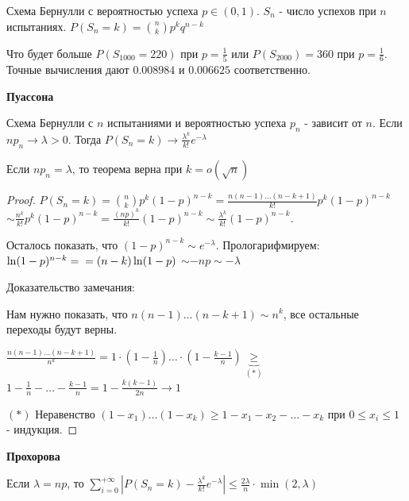 \begin{definition}
    Схема Бернулли с вероятностью успеха $p \in (0, 1)$. $S_n$ - число успехов при $n$ испытаниях. $P(S_n = k) = \binom{n}{k} p^k q^{n - k}$

    Что будет больше $P(S_{1000} = 220)$ при $p = \frac{1}{5}$ или $P(S_{2000}) = 360$ при $p = \frac{1}{6}$. Точные вычисления дают $0.008984$ и 
    $0.006625$ соответственно.

\end{definition}

\begin{theorem}
    \textbf{Пуассона}

    Схема Бернулли с $n$ испытаниями и вероятностью успеха $p_n$ - зависит от $n$.
    Если $np_n \rightarrow \lambda > 0$. Тогда $P(S_n = k) \rightarrow \frac{\lambda^k}{k!} e^{-\lambda}$
\end{theorem}

\begin{remark}
    Если $n p_n = \lambda$, то теорема верна при $k = o(\sqrt{n})$
\end{remark}

\begin{proof}
    $P(S_n = k) = \binom{n}{k} p^k (1 - p)^{n - k} = \frac{n(n - 1)\ldots(n - k + 1)}{k!} p^k (1 - p)^{n - k}$
    $\sim \frac{n^k}{k!} p^k (1 - p)^{n - k} = \frac{(np)^k}{k!} (1 - p)^{n - k} \sim \frac{\lambda^k}{k!} (1 - p)^{n - k}$.
    
    Осталось показать, что $(1 - p)^{n - k} \sim e^{-\lambda}$. Прологарифмируем: $\ln (1 - p)^{n - k} = \\ = (n - k) \ln (1 - p)$
    $\sim -n p \sim -\lambda$

    Доказательство замечания:

    Нам нужно показать, что $n(n - 1)\ldots(n - k + 1) \sim n^k$, все остальные переходы будут верны.

    $\frac{n(n - 1) \ldots (n - k + 1)}{n^k} = 1 \cdot (1 - \frac{1}{n}) \ldots \cdot (1 - \frac{k - 1}{n}) \underbrace{\geqslant}_{(*)}$
    $1 - \frac{1}{n} - \ldots -  \frac{k - 1}{n} = 1 - \frac{k(k - 1)}{2n} \rightarrow 1$

    $(*)$ Неравенство $(1 - x_1) \ldots (1 - x_k) \geqslant 1 - x_1 - x_2 - \ldots - x_k$ при $0 \leqslant x_i \leqslant 1$ - индукция.
\end{proof}

\begin{theorem}
    \textbf{Прохорова}

    Если $\lambda = np$, то $\sum_{i = 0}^{+\infty} |P(S_n = k) - \frac{\lambda^k}{k!}e^{-\lambda}| \leqslant \frac{2\lambda}{n} \cdot \min(2, \lambda)$

\end{theorem}

